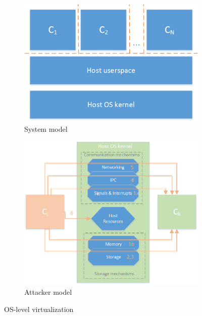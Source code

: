 \begin{figure}[t]
\centering
\begin{subfigure}{.5\textwidth}
  \centering
  \includegraphics[width=0.8\linewidth]{figures/os-virtualization-sys-model.png}
  \caption{System model}
  \label{fig:osv-1}
\end{subfigure}%
\begin{subfigure}{.5\textwidth}
  \centering
  \includegraphics[width=1\linewidth]{figures/OS-virtualization-attacker-model.png}
  \caption{Attacker model}
  \label{fig:osv-2}
\end{subfigure}
\caption{OS-level virtualization}
\label{fig:os-virtualization}
\end{figure}

